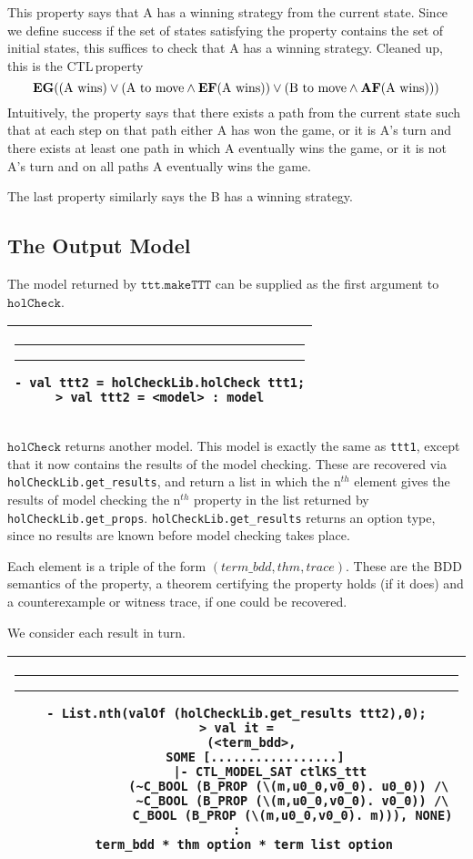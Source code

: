 \documentclass{article}
\makeatletter
\newcommand{\ctl}{\textsf{CTL}\,}
\newlength{\hsbw}
\newcounter{sessioncount}
\newcommand\MLSpacing{13pt}
\newenvironment{session}{\begin{flushleft}
 \begin{tabular}{@{}|c@{}|@{}}\hline 
 \begin{minipage}[b]{\hsbw}
 \vspace*{-.5pt}
 \begin{flushright}
 \rule{0.01in}{.15in}\rule{0.3in}{0.01in}\hspace{-0.35in}
 \raisebox{0.04in}{\makebox[0.3in][c]{\footnotesize\sl \thesessioncount}}
 \end{flushright}
 \vspace*{-.45in}
 \begingroup\small\baselineskip\MLSpacing}{\endgroup\end{minipage}\\ \hline 
 \end{tabular}
 \end{flushleft}
 \stepcounter{sessioncount}}
\makeatother
\begin{document}
This property says that A has a winning strategy from the current state. Since we define success if the set of states satisfying the property contains the set of initial states, this suffices to check that A has a winning strategy. Cleaned up, this is the \ctl property \[ \mathbf{EG} (\textup{(A wins)} \lor (\textup{A to move} \land \mathbf{EF} (\textup{A wins})) \lor (\textup{B to move} \land \mathbf{AF} (\textup{A wins})))\] Intuitively, the property says that there exists a path from the current state such that at each step on that path either A has won the game, or it is A's turn and there exists at least one path in which A eventually wins the game, or it is not A's turn and on all paths A eventually wins the game. 

The last property similarly says the B has a winning strategy. 

\subsection{The Output Model}

The model returned by \(\mathtt{ttt.makeTTT}\) can be supplied as the first argument to \(\mathtt{holCheck}\).

\begin{session}\begin{verbatim} 
- val ttt2 = holCheckLib.holCheck ttt1;
> val ttt2 = <model> : model
\end{verbatim}\end{session}
 
\(\mathtt{holCheck}\) returns another model. This model is exactly the same as \texttt{ttt1}, except that it now contains the results of the model checking. These are recovered via \texttt{holCheckLib.get\_results}, and return a list in which the n\({}^{th}\) element gives the results of model checking the n\({}^{th}\) property in the list returned by \texttt{holCheckLib.get\_props}. \texttt{holCheckLib.get\_results} returns an option type, since no results are known before model checking takes place.

Each element is a triple of the form \( (term\_bdd,thm,trace) \). These are the BDD semantics of the property, a theorem certifying the property holds (if it does) and a counterexample or witness trace, if one could be recovered. 

We consider each result in turn.

\begin{session}\begin{verbatim} 
- List.nth(valOf (holCheckLib.get_results ttt2),0);
> val it =
    (<term_bdd>,
     SOME [.................]
         |- CTL_MODEL_SAT ctlKS_ttt
              (~C_BOOL (B_PROP (\(m,u0_0,v0_0). u0_0)) /\
               ~C_BOOL (B_PROP (\(m,u0_0,v0_0). v0_0)) /\
               C_BOOL (B_PROP (\(m,u0_0,v0_0). m))), NONE) :
  term_bdd * thm option * term list option
\end{verbatim}\end{session}
\end{document}
